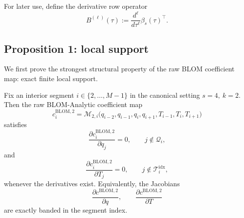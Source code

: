 For later use, define the derivative row operator
\[
B^{(\ell)}(\tau):=\frac{d^\ell}{d\tau^\ell}\beta_s(\tau)^\top.
\]

\subsection{Proposition 1: local support}
\label{subsec:phase6_prop1}

We first prove the strongest structural property of the raw BLOM coefficient map: exact finite local support.

\begin{proposition}
\label{prop:phase6_local_support}
Fix an interior segment \(i\in\{2,\dots,M-1\}\) in the canonical setting \(s=4,\ k=2\).
Then the raw BLOM-Analytic coefficient map
\[
c_i^{\mathrm{BLOM},2}
=
\mathcal M_{2,i}\bigl(q_{i-2},q_{i-1},q_i,q_{i+1},T_{i-1},T_i,T_{i+1}\bigr)
\]
satisfies
\begin{equation}
\label{eq:phase6_dcdq_zero}
\frac{\partial c_i^{\mathrm{BLOM},2}}{\partial q_j}=0,
\qquad
j\notin \mathcal Q_i,
\end{equation}
and
\begin{equation}
\label{eq:phase6_dcdT_zero}
\frac{\partial c_i^{\mathrm{BLOM},2}}{\partial T_j}=0,
\qquad
j\notin \mathcal T_i^{\mathrm{idx}},
\end{equation}
whenever the derivatives exist.
Equivalently, the Jacobians
\[
\frac{\partial c^{\mathrm{BLOM},2}}{\partial q},
\qquad
\frac{\partial c^{\mathrm{BLOM},2}}{\partial T}
\]
are exactly banded in the segment index.
\end{proposition}

